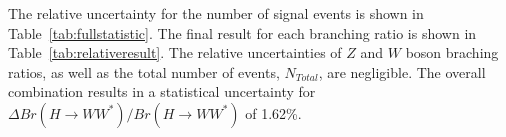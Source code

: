 \documentclass[11pt,a4paper]{cepcnote}
\begin{document}
The relative uncertainty for the number of signal events is shown in
Table~\ref{tab:fullstatistic}. The final result for each branching
ratio is shown in Table~\ref{tab:relativeresult}. 
The relative uncertainties of $Z$ and $W$ boson braching ratios, as well as
the total number of events, $N_{Total}$, are negligible. 
The overall combination results in a statistical uncertainty for
$\Delta{Br(H\rightarrow WW^*)}/Br(H\rightarrow WW^*)$ of 1.62\%.

%

%
%
%
\end{document}
